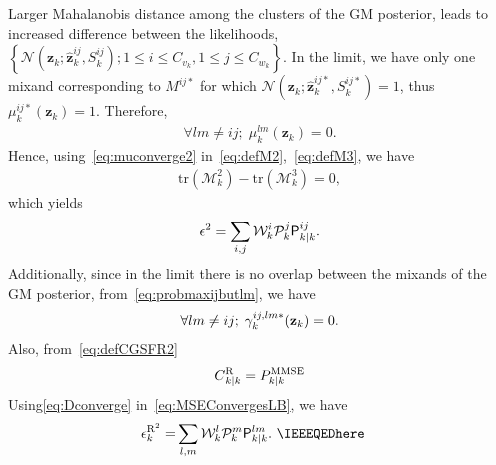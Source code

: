 \documentclass[10pt,twocolumn,twoside]{IEEEtran}
\newcommand{\Pmmse}{P_{k|k}^{\mathrm{MMSE}}}
\newcommand{\corcol}[1]{\textcolor{CorCol}{#1}}
\begin{document}
\begin{IEEEproof}
Larger Mahalanobis distance among the clusters of the GM posterior, leads to increased difference between the likelihoods,
\(\left\lbrace\mathcal{N}\left(\mathbf{z}_k; \mathbf{\hat{z}}_{k}^{ij}, S_k^{ij}\right); 1 \leq i \leq {C_{v_k}}, 1\leq j \leq {C_{w_k}} \right\rbrace\).
In the limit, we have only one mixand corresponding to \(M^{ij*}\) for which \(\mathcal{N}\left(\mathbf{z}_k; \mathbf{\hat{z}}_{k}^{ij*}, S_k^{ij*}\right)=1\), thus \(\mu_{k}^{ij*}{\left(\mathbf{z}_{k}\right)} =  1\). Therefore, 
\begin{align}
\label{eq:muconverge2}
\forall lm \neq ij; \; \mu_{k}^{lm}{\left(\mathbf{z}_{k}\right)} =  0.
\end{align}
Hence, using~\eqref{eq:muconverge2} in~\eqref{eq:defM2},~\eqref{eq:defM3}, we have
\begin{align}
\mathrm{tr}{\left(\mathcal{M}_k^2\right)}-\mathrm{tr}{\left(\mathcal{M}_k^3\right)} =0,
\end{align}
which yields
\begin{align}
\label{eq:MSEConvergesLB}
\epsilon ^ 2 = 
 \sum \limits _{i,j} \corcol{\mathcal{W}^i_k\mathcal{P}^j_k} \mathsf{P}_{k|k}^{ij}.
\end{align}
Additionally, since in the limit there is no overlap between the mixands of the GM posterior, from~\eqref{eq:probmaxijbutlm}, we have
\begin{align}
\label{eq:gamaconverge}
\forall lm \neq ij; \; \gamma_k^{ij,lm*}{\corcol{\left({\mathbf{z}_k}\right)}} = 0.
\end{align}
Also, from\corcol{~\eqref{eq:defCGSFR2}}
\begin{align}
\label{eq:Dconverge}
\corcol{\corcol{C}_{k|k}^{\mathrm{R}} = \Pmmse}
\end{align}
\corcol{Using\eqref{eq:Dconverge} in~\eqref{eq:MSEConvergesLB}, we have}
\begin{align}
\corcol{\epsilon_k^{\mathrm{R}^2}} = & \sum\limits_{l,m} \corcol{\mathcal{W}^l_k\mathcal{P}^m_k} \mathsf{P}_{k|k}^{lm}. \ \IEEEQEDhere
\end{align}
\end{IEEEproof}
 
\end{document}

